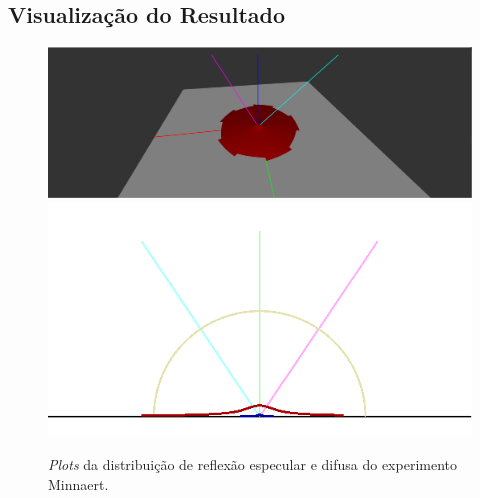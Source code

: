 \subsection{Visualização do Resultado}
\begin{figure}[H]
    \caption{\small{\textit{Plots} da distribuição de reflexão especular e difusa do experimento Minnaert.}}
    \label{fig-minnaert-plots}
    \vspace{42px}
  \includegraphics[width=\linewidth]{./Imagens/brdfs/minnaert-3D-plot}
\endminipage\hfill
{}
  \includegraphics[width=\linewidth]{./Imagens/brdfs/minnaert-polar-plot.png}
\endminipage\hfill
\end{figure}

